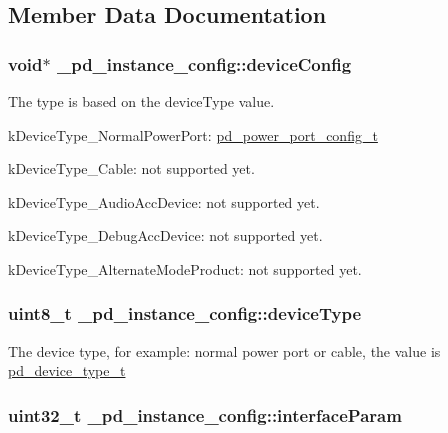 \subsection{Member Data Documentation}
\hypertarget{struct__pd__instance__config_a1aa5e1d3d8e54bcaa77f41a6de3eb371}{
\subsubsection[{device\-Config}]{\setlength{\rightskip}{0pt plus 5cm}void$\ast$ \-\_\-pd\-\_\-instance\-\_\-config\-::device\-Config}}\label{struct__pd__instance__config_a1aa5e1d3d8e54bcaa77f41a6de3eb371}
The type is based on the device\-Type value.
\begin{DoxyItemize}
\item k\-Device\-Type\-\_\-\-Normal\-Power\-Port\-: \hyperlink{group__usb__pd__stack_ga1897a14a90aea9e4b0e7cf1e5b4ea449}{pd\-\_\-power\-\_\-port\-\_\-config\-\_\-t}
\item k\-Device\-Type\-\_\-\-Cable\-: not supported yet.
\item k\-Device\-Type\-\_\-\-Audio\-Acc\-Device\-: not supported yet.
\item k\-Device\-Type\-\_\-\-Debug\-Acc\-Device\-: not supported yet.
\item k\-Device\-Type\-\_\-\-Alternate\-Mode\-Product\-: not supported yet. 
\end{DoxyItemize}\hypertarget{struct__pd__instance__config_a68e8aae835b95ae67d48701973864acf}{
\subsubsection[{device\-Type}]{\setlength{\rightskip}{0pt plus 5cm}uint8\-\_\-t \-\_\-pd\-\_\-instance\-\_\-config\-::device\-Type}}\label{struct__pd__instance__config_a68e8aae835b95ae67d48701973864acf}
The device type, for example\-: normal power port or cable, the value is \hyperlink{group__usb__pd__stack_gac70b6cd09eeb45ce1aeaa279f44adbc7}{pd\-\_\-device\-\_\-type\-\_\-t} \hypertarget{struct__pd__instance__config_a7e72c5dda8b81981ebd3062f6999bce1}{
\subsubsection[{interface\-Param}]{\setlength{\rightskip}{0pt plus 5cm}uint32\-\_\-t \-\_\-pd\-\_\-instance\-\_\-config\-::interface\-Param}}\label{struct__pd__instance__config_a7e72c5dda8b81981ebd3062f6999bce1}
